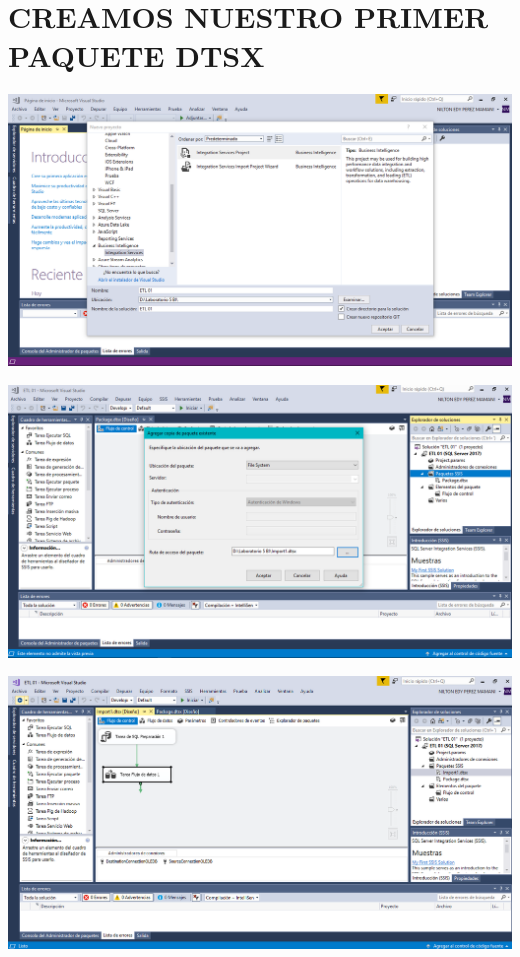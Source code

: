 \section{CREAMOS NUESTRO PRIMER PAQUETE DTSX}
\item{
\begin{center}
\includegraphics[width=15cm]{./Imagenes/imagen13}
\end{center}
\begin{center}
\includegraphics[width=15cm]{./Imagenes/imagen14}
\end{center}
\begin{center}
\includegraphics[width=15cm]{./Imagenes/imagen15}

\end{center}}
